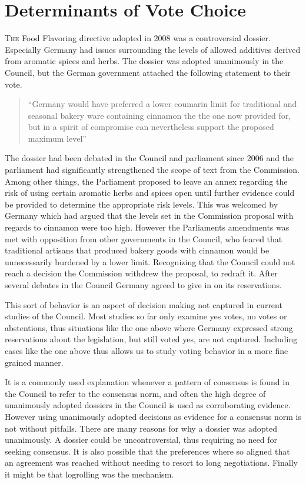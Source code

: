 
\chapter{Determinants of Vote Choice}

\lettrine{T}{he} Food Flavoring directive adopted in 2008 was a controversial dossier. Especially Germany had issues surrounding the levels of allowed additives derived from aromatic spices and herbs. The dossier was adopted unanimously in the Council, but the German government attached the following statement to their vote. 

\begin{quote}
  ``Germany would have preferred a lower coumarin limit for traditional and seasonal bakery ware containing cinnamon the the one now provided for, but in a spirit of compromise can nevertheless support the proposed maximum level''
\end{quote}

 The dossier had been debated in the Council and parliament since 2006 and the parliament had significantly strengthened the scope of text from the Commission. Among other things, the Parliament proposed to leave an annex regarding the risk of using certain aromatic herbs and spices open until further evidence could be provided to determine the appropriate risk levels. This was welcomed by Germany which had argued that the levels set in the Commission proposal with regards to cinnamon were too high. However the Parliaments amendments was met with opposition from other governments in the Council, who feared that traditional artisans that produced bakery goods with cinnamon would be unnecessarily burdened by a lower limit.  Recognizing that the Council could not reach a decision the Commission withdrew the proposal, to redraft it. After several debates in the Council Germany agreed to give in on its reservations. 

This sort of behavior is an aspect of decision making not captured in current studies of the Council.  Most studies so far only examine yes votes, no votes or abstentions, thus situations like the one above where Germany expressed strong reservations about the legislation, but still voted yes, are not captured. Including cases like the one above thus allows us to study voting behavior in a more fine grained manner.

It is a commonly used explanation whenever a pattern of consensus is found in the Council to refer to the consensus norm, and often the high degree of unanimously adopted dossiers in the Council is used as corroborating evidence. However using unanimously adopted decisions as evidence for a consensus norm is not without pitfalls. There are many reasons for why a dossier was adopted unanimously. A dossier could be uncontroversial, thus requiring no need for seeking consensus. It is also possible that the preferences where so aligned that an agreement was reached without needing to resort to long negotiations. Finally it might be that logrolling was the mechanism. 

